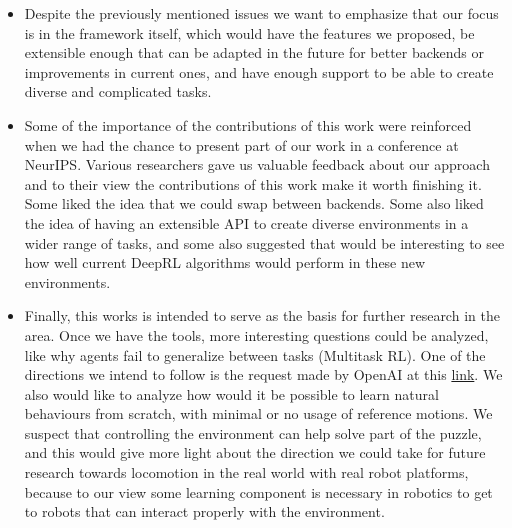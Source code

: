 \begin{itemize}
    \item Despite the previously mentioned issues we want to emphasize that our
          focus is in the framework itself, which would have the features we proposed,
          be extensible enough that can be adapted in the future for better
          backends or improvements in current ones, and have enough support to be
          able to create diverse and complicated tasks.

    \item Some of the importance of the contributions of this work were
          reinforced when we had the chance to present part of our work in a conference
          at NeurIPS. Various researchers gave us valuable feedback about our approach
          and to their view the contributions of this work make it worth finishing it.
          Some liked the idea that we could swap between backends. Some also liked
          the idea of having an extensible API to create diverse environments in a wider
          range of tasks, and some also suggested that would be interesting to see 
          how well current DeepRL algorithms would perform in these new environments.

    \item Finally, this works is intended to serve as the basis for further research
          in the area. Once we have the tools, more interesting questions could be analyzed,
          like why agents fail to generalize between tasks (Multitask RL). One of the
          directions we intend to follow is the request made by OpenAI at this 
          \href{https://openai.com/requests-for-research/#multitask-rl-with-continuous-actions}{link}.
          We also would like to analyze how would it be possible to learn natural
          behaviours from scratch, with minimal or no usage of reference motions. We
          suspect that controlling the environment can help solve part of the puzzle,
          and this would give more light about the direction we could take for future
          research towards locomotion in the real world with real robot platforms,
          because to our view some learning component is necessary in robotics
          to get to robots that can interact properly with the environment.
\end{itemize}

